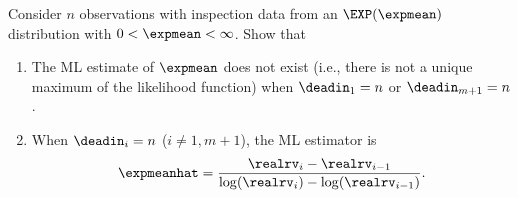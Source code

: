 \begin{exercise1}
\label{exercise:exponential.ml.exist}
Consider $n$ observations with inspection data from an
$\EXP(\expmean)$ distribution with $0<\expmean<\infty$.  Show that
\begin{enumerate}
\item	
\label{exercise.part:exponential.ml.exist.allf}
The ML estimate of $\expmean$ does not 	exist (i.e., there is not a
unique maximum of the likelihood function) when
$\deadin_{1}=n$ or $\deadin_{m+1}=n$.
\item 
\label{exercise.part:exponential.ml.exist.allc}
When $\deadin_{i}=n$ ($i \ne 1, m+1$), the ML estimator is
\begin{displaymath} 
\expmeanhat=\frac{\realrv_{i}-\realrv_{i-1}}
{\log(\realrv_{i})-\log(\realrv_{i-1})}.
\end{displaymath} 	
\end{enumerate}
\end{exercise1}


